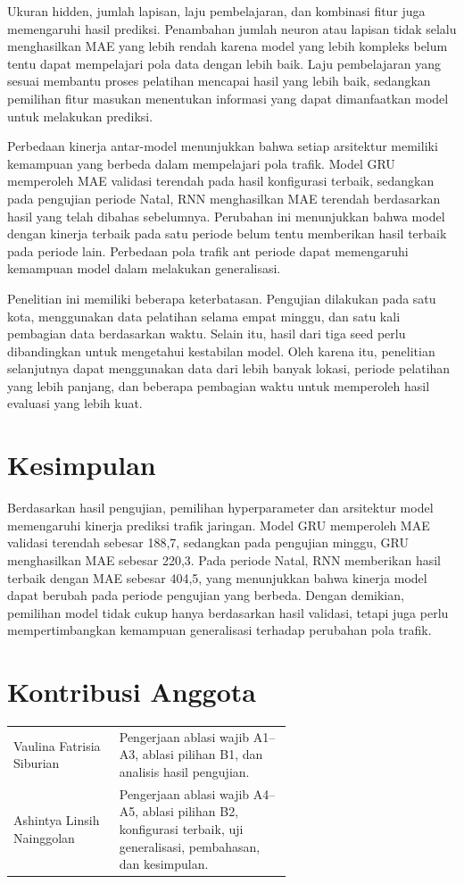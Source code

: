 \documentclass[conference,a4paper]{IEEEtran}
\begin{document}
Ukuran hidden, jumlah lapisan, laju pembelajaran, dan kombinasi fitur juga memengaruhi hasil prediksi. Penambahan jumlah neuron atau lapisan tidak selalu menghasilkan MAE yang lebih rendah karena model yang lebih kompleks belum tentu dapat mempelajari pola data dengan lebih baik. Laju pembelajaran yang sesuai membantu proses pelatihan mencapai hasil yang lebih baik, sedangkan pemilihan fitur masukan menentukan informasi yang dapat dimanfaatkan model untuk melakukan prediksi.

Perbedaan kinerja antar-model menunjukkan bahwa setiap arsitektur memiliki kemampuan yang berbeda dalam mempelajari pola trafik. Model GRU memperoleh MAE validasi terendah pada hasil konfigurasi terbaik, sedangkan pada pengujian periode Natal, RNN menghasilkan MAE terendah berdasarkan hasil yang telah dibahas sebelumnya. Perubahan ini menunjukkan bahwa model dengan kinerja terbaik pada satu periode belum tentu memberikan hasil terbaik pada periode lain. Perbedaan pola trafik ant periode dapat memengaruhi kemampuan model dalam melakukan generalisasi.

Penelitian ini memiliki beberapa keterbatasan. Pengujian dilakukan pada satu kota, menggunakan data pelatihan selama empat minggu, dan satu kali pembagian data berdasarkan waktu. Selain itu, hasil dari tiga seed perlu dibandingkan untuk mengetahui kestabilan model. Oleh karena itu, penelitian selanjutnya dapat menggunakan data dari lebih banyak lokasi, periode pelatihan yang lebih panjang, dan beberapa pembagian waktu untuk memperoleh hasil evaluasi yang lebih kuat.

\section{Kesimpulan}
Berdasarkan hasil pengujian, pemilihan hyperparameter dan arsitektur model memengaruhi kinerja prediksi trafik jaringan. Model GRU memperoleh MAE validasi terendah sebesar 188,7, sedangkan pada pengujian minggu, GRU menghasilkan MAE sebesar 220,3. Pada periode Natal, RNN memberikan hasil terbaik dengan MAE sebesar 404,5, yang menunjukkan bahwa kinerja model dapat berubah pada periode pengujian yang berbeda. Dengan demikian, pemilihan model tidak cukup hanya berdasarkan hasil validasi, tetapi juga perlu mempertimbangkan kemampuan generalisasi terhadap perubahan pola trafik.

\section*{Kontribusi Anggota}
\begin{tabular}{@{}lp{0.62\linewidth}@{}}
  Vaulina Fatrisia Siburian & Pengerjaan ablasi wajib A1--A3, ablasi pilihan B1, dan analisis hasil pengujian. \\
  Ashintya Linsih Nainggolan & Pengerjaan ablasi wajib A4--A5, ablasi pilihan B2, konfigurasi terbaik, uji generalisasi, pembahasan, dan kesimpulan. \\
\end{tabular}
\end{document}
